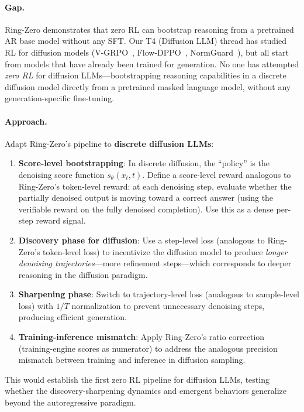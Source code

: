 \documentclass[11pt,a4paper]{article}
\begin{document}
\paragraph{Gap.} Ring-Zero demonstrates that zero RL can bootstrap reasoning from a pretrained AR base model without any SFT. Our T4 (Diffusion LLM) thread has studied RL for diffusion models (V-GRPO~\cite{vgrpo2026}, Flow-DPPO~\cite{flowdppo2026}, NormGuard~\cite{normguard2026}), but all start from models that have already been trained for generation. No one has attempted \emph{zero RL} for diffusion LLMs---bootstrapping reasoning capabilities in a discrete diffusion model directly from a pretrained masked language model, without any generation-specific fine-tuning.

\paragraph{Approach.} Adapt Ring-Zero's pipeline to \textbf{discrete diffusion LLMs}:
\begin{enumerate}
\item \textbf{Score-level bootstrapping}: In discrete diffusion, the ``policy'' is the denoising score function $s_\theta(x_t, t)$. Define a score-level reward analogous to Ring-Zero's token-level reward: at each denoising step, evaluate whether the partially denoised output is moving toward a correct answer (using the verifiable reward on the fully denoised completion). Use this as a dense per-step reward signal.
\item \textbf{Discovery phase for diffusion}: Use a step-level loss (analogous to Ring-Zero's token-level loss) to incentivize the diffusion model to produce \emph{longer denoising trajectories}---more refinement steps---which corresponds to deeper reasoning in the diffusion paradigm.
\item \textbf{Sharpening phase}: Switch to trajectory-level loss (analogous to sample-level loss) with $1/T$ normalization to prevent unnecessary denoising steps, producing efficient generation.
\item \textbf{Training-inference mismatch}: Apply Ring-Zero's ratio correction (training-engine scores as numerator) to address the analogous precision mismatch between training and inference in diffusion sampling.
\end{enumerate}
This would establish the first zero RL pipeline for diffusion LLMs, testing whether the discovery-sharpening dynamics and emergent behaviors generalize beyond the autoregressive paradigm.
\end{document}
